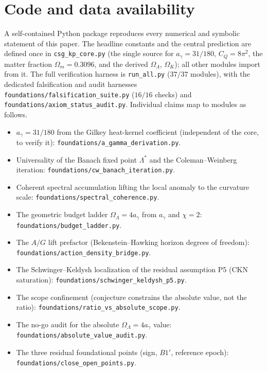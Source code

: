 \documentclass[11pt,a4paper]{article}
\theoremstyle{plain}
\theoremstyle{definition}
\theoremstyle{remark}
\newcommand{\Ok}{\Omega_K}
\newcommand{\OL}{\Omega_\Lambda}
\newcommand{\Om}{\Omega_m}
\newcommand{\ag}{a_\gamma}
\newcommand{\CQ}{C_Q}
\begin{document}
\section{Code and data availability}
\label{sec:code}
A self-contained Python package reproduces every numerical and symbolic statement of this
paper. The headline constants and the central prediction are defined once in
\texttt{csg\_kp\_core.py} (the single source for $\ag = 31/180$, $\CQ = 8\pi^2$, the matter
fraction $\Om = 0.3096$, and the derived $\OL$, $\Ok$); all other modules import from it. The
full verification harness is \texttt{run\_all.py} ($37/37$ modules), with the dedicated
falsification and audit harnesses \texttt{foundations/falsification\_suite.py} ($16/16$ checks)
and \texttt{foundations/axiom\_status\_audit.py}. Individual claims map to modules as follows.
\begin{itemize}[leftmargin=*,nosep]
\item $\ag = 31/180$ from the Gilkey heat-kernel coefficient (independent of the core, to verify
it): \texttt{foundations/a\_gamma\_derivation.py}.
\item Universality of the Banach fixed point $\Lambda^*$ and the Coleman--Weinberg iteration:
\texttt{foundations/cw\_banach\_iteration.py}.
\item Coherent spectral accumulation lifting the local anomaly to the curvature scale:
\texttt{foundations/spectral\_coherence.py}.
\item The geometric budget ladder $\OL = 4\ag$ from $\ag$ and $\chi = 2$:
\texttt{foundations/budget\_ladder.py}.
\item The $A/G$ lift prefactor (Bekenstein--Hawking horizon degrees of freedom):
\texttt{foundations/action\_density\_bridge.py}.
\item The Schwinger--Keldysh localization of the residual assumption P5 (CKN saturation):
\texttt{foundations/schwinger\_keldysh\_p5.py}.
\item The scope confinement (conjecture constrains the absolute value, not the ratio):
\texttt{foundations/ratio\_vs\_absolute\_scope.py}.
\item The no-go audit for the absolute $\OL = 4\ag$ value:
\texttt{foundations/absolute\_value\_audit.py}.
\item The three residual foundational points (sign, $B1'$, reference epoch):
\texttt{foundations/close\_open\_points.py}.
\end{itemize}
\end{document}
